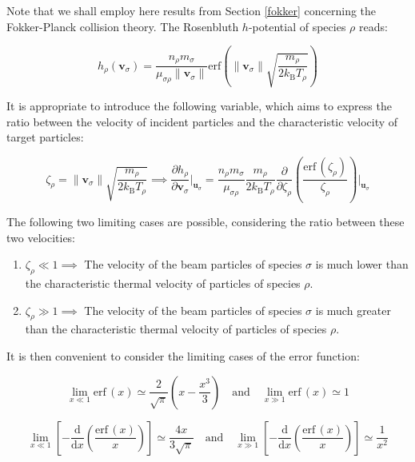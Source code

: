 Note that we shall employ here results from Section \ref{fokker} concerning the Fokker-Planck collision theory. The Rosenbluth $h$-potential of species $\rho$ reads:

\begin{equation*}
    h_\rho(\mathbf{v}_\sigma)=\frac{n_\rho m_\sigma}{\mu_{\sigma\rho}\|\mathbf{v}_\sigma\|}\mathrm{erf}{\left(\|\mathbf{v}_\sigma\|\sqrt{\frac{m_\rho}{2k_\mathrm{B}T_\rho}}\right)}
\end{equation*}

It is appropriate to introduce the following variable, which aims to express the ratio between the velocity of incident particles and the characteristic velocity of target particles:

\begin{equation*}
    \zeta_\rho=\|\mathbf{v}_\sigma\|\sqrt{\frac{m_\rho}{2k_\mathrm{B}T_\rho}}\implies\frac{\partial h_\rho}{\partial\mathbf{v}_\sigma}\Biggr|_{\mathbf{u}_\sigma}=\frac{n_\rho m_\sigma}{\mu_{\sigma\rho}}\frac{m_\rho}{2k_\mathrm{B}T_\rho}\frac{\partial}{\partial\zeta_\rho}\left(\frac{\mathrm{erf}\,\left(\zeta_\rho\right)}{\zeta_\rho}\right)\Biggr|_{\mathbf{u}_\sigma}
\end{equation*}

The following two limiting cases are possible, considering the ratio between these two velocities:

\begin{enumerate}
    \item $\zeta_\rho\ll1\implies$ The velocity of the beam particles of species $\sigma$ is much lower than the characteristic thermal velocity of particles of species $\rho$.
    \item $\zeta_\rho\gg1\implies$ The velocity of the beam particles of species $\sigma$ is much greater than the characteristic thermal velocity of particles of species $\rho$.
\end{enumerate}

It is then convenient to consider the limiting cases of the error function:

\begin{equation}
    \lim_{x\ll1}\mathrm{erf}\,(x)\simeq\frac{2}{\sqrt{\pi}}\left(x-\frac{x^3}{3}\right)\quad\text{and}\quad\lim_{x\gg1}\mathrm{erf}\,(x)\simeq1
\end{equation}

\begin{equation}
    \label{eq-7-48}
    \lim_{x\ll1}\left[-\frac{\mathrm{d}}{\mathrm{d}x}\left(\frac{\mathrm{erf}\,(x)}{x}\right)\right]\simeq\frac{4x}{3\sqrt{\pi}}\quad\text{and}\quad\lim_{x\gg1}\left[-\frac{\mathrm{d}}{\mathrm{d}x}\left(\frac{\mathrm{erf}\,(x)}{x}\right)\right]\simeq\frac{1}{x^2}
\end{equation}

